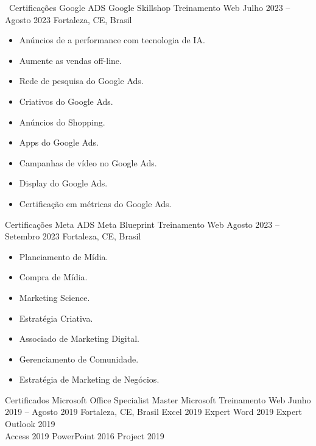 \begin{commentB}
\cvevent
	{%
		\faGoogle\ Certificações Google ADS%
		\quad%
		\hrulefill%
		}
	{Google Skillshop \hfill \faEdge Treinamento Web}
	{Julho 2023 -- Agosto 2023}
	{Fortaleza, CE, Brasil}
\vspace{-0.5em}
\begin{multicols}{2}
	\begin{itemize}[leftmargin=*,itemsep=0.5em,topsep=0.5em]
		\item Anúncios de a performance com tecnologia de IA.
		\item Aumente as vendas off-line.
		\item Rede de pesquisa do Google Ads.
		\item Criativos do Google Ads.
		\item Anúncios do Shopping.
		\item Apps do Google Ads.
		\item Campanhas	de vídeo no Google Ads.
		\item Display do Google Ads.
		\item Certificação em métricas do Google Ads.
	\end{itemize}
\end{multicols}
\cvevent
	{\faFacebook  Certificações Meta ADS%
		\quad%
		\hrulefill%
		}
	{Meta Blueprint \hfill \faEdge Treinamento Web}
	{Agosto 2023 -- Setembro 2023}
	{Fortaleza, CE, Brasil}
\vspace{-0.5em}
\begin{multicols}{2}
	\begin{itemize}[leftmargin=*,itemsep=0.5em,topsep=0.5em]
		\item Planeiamento de Mídia.
		\item Compra de Mídia.
		\item Marketing Science.
		\item Estratégia Criativa.
		\item Associado de Marketing Digital.
		\item Gerenciamento de Comunidade.
		\item Estratégia de Marketing de Negócios.
	\end{itemize}
\end{multicols}
\cvevent
{\faMicrosoft Certificados Microsoft Office Specialist Master}
{Microsoft \hfill \faEdge Treinamento Web%
		\quad%
		\hrulefill%
		}
{Junho 2019 -- Agosto 2019}
{Fortaleza, CE, Brasil}
\cvtag
{\footnotesize\faFileExcel[regular] Excel 2019 Expert}
\cvtag
{\footnotesize\faFileWord[regular] Word 2019 Expert}
\cvtag
{\footnotesize Outlook 2019} \\
\cvtag
{\footnotesize\faDatabase Access 2019}
\cvtag
{\footnotesize\faFilePowerpoint[regular] PowerPoint 2016}
\cvtag
{\footnotesize Project 2019}
\end{commentB}
